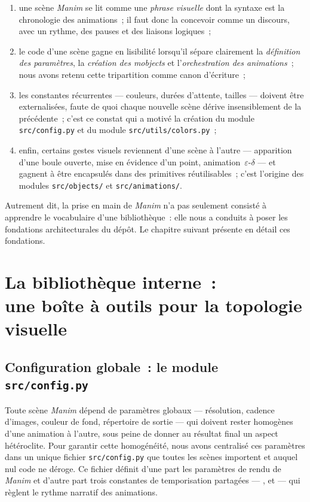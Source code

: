 \documentclass[12pt, a4paper, openany]{report}
\begin{document}
	\begin{enumerate}
		\item une scène \textit{Manim} se lit comme une \emph{phrase visuelle} dont la syntaxe est la chronologie des animations~; il faut donc la concevoir comme un discours, avec un rythme, des pauses et des liaisons logiques~;
		\item le code d’une scène gagne en lisibilité lorsqu’il sépare clairement la \emph{définition des paramètres}, la \emph{création des mobjects} et l’\emph{orchestration des animations}~; nous avons retenu cette tripartition comme canon d’écriture~;
		\item les constantes récurrentes — couleurs, durées d’attente, tailles — doivent être externalisées, faute de quoi chaque nouvelle scène dérive insensiblement de la précédente~; c’est ce constat qui a motivé la création du module \texttt{src/config.py} et du module \texttt{src/utils/colors.py}~;
		\item enfin, certains gestes visuels reviennent d’une scène à l’autre — apparition d’une boule ouverte, mise en évidence d’un point, animation~$\varepsilon$-$\delta$ — et gagnent à être encapsulés dans des primitives réutilisables~; c’est l’origine des modules \texttt{src/objects/} et \texttt{src/animations/}.
	\end{enumerate}

	Autrement dit, la prise en main de \textit{Manim} n’a pas seulement consisté à apprendre le vocabulaire d’une bibliothèque~: elle nous a conduits à poser les fondations architecturales du dépôt. Le chapitre suivant présente en détail ces fondations.
	
	\chapter[Bibliothèque interne]{La bibliothèque interne~:\\une boîte à outils pour la topologie visuelle}\label{chap:bibliotheque}

	\section{Configuration globale~: le module \texttt{src/config.py}}

	Toute scène \textit{Manim} dépend de paramètres globaux — résolution, cadence d’images, couleur de fond, répertoire de sortie — qui doivent rester homogènes d’une animation à l’autre, sous peine de donner au résultat final un aspect hétéroclite. Pour garantir cette homogénéité, nous avons centralisé ces paramètres dans un unique fichier \texttt{src/config.py} que toutes les scènes importent et auquel nul code ne déroge. Ce fichier définit d’une part les paramètres de rendu de \textit{Manim} et d’autre part trois constantes de temporisation partagées — ,  et  — qui règlent le rythme narratif des animations.
\end{document}
